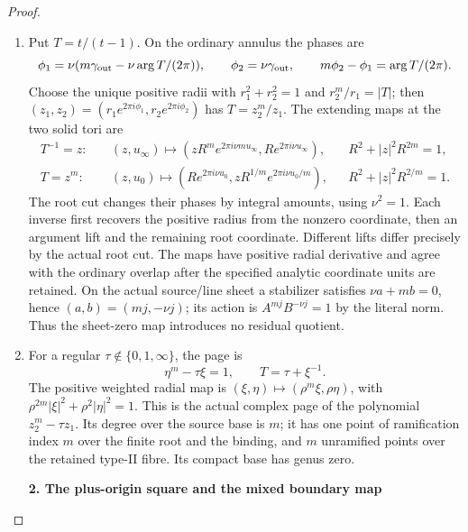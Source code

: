 \begin{proof}
\begin{enumerate}[label=\arabic*.]
\item Put \(T=t/(t-1)\). On the ordinary annulus the phases are
\[
\phi_1=\nu(m\gamma_{\rm out}-\nu\arg T/(2\pi)),\qquad
\phi_2=\nu\gamma_{\rm out},\qquad
m\phi_2-\phi_1=\arg T/(2\pi).
\]
Choose the unique positive radii with
\(r_1^2+r_2^2=1\) and \(r_2^m/r_1=|T|\); then
\((z_1,z_2)=(r_1e^{2\pi i\phi_1},r_2e^{2\pi i\phi_2})\)
has \(T=z_2^m/z_1\). The extending maps at the two solid tori are
\[
\begin{aligned}
T^{-1}=z:\quad &(z,u_\infty)\longmapsto
(zR^m e^{2\pi i\nu m u_\infty},R e^{2\pi i\nu u_\infty}),
&&R^2+|z|^2R^{2m}=1,\\
T=z^m:\quad &(z,u_0)\longmapsto
(R e^{2\pi i\nu u_0},zR^{1/m}e^{2\pi i\nu u_0/m}),
&&R^2+|z|^2R^{2/m}=1.
\end{aligned}
\]
The root cut changes their phases by integral amounts, using
\(\nu^2=1\). Each inverse first recovers the positive radius from
the nonzero coordinate, then an argument lift and the remaining
root coordinate. Different lifts differ precisely by the actual
root cut. The maps have positive radial derivative and agree with
the ordinary overlap after the specified analytic coordinate units
are retained. On the actual source/line sheet a stabilizer satisfies
\(\nu a+mb=0\), hence \((a,b)=(mj,-\nu j)\); its action is
\(A^{mj}B^{-\nu j}=1\) by the literal norm. Thus the sheet-zero
map introduces no residual quotient.

\item For a regular \(\tau\notin\{0,1,\infty\}\), the page is
\[
\eta^m-\tau\xi=1,\qquad T=\tau+\xi^{-1}.
\]
The positive weighted radial map is
\((\xi,\eta)\mapsto(\rho^m\xi,\rho\eta)\), with
\(\rho^{2m}|\xi|^2+\rho^2|\eta|^2=1\). This is the actual complex
page of the polynomial \(z_2^m-\tau z_1\). Its degree over the
source base is \(m\); it has one point of ramification index \(m\)
over the finite root and the binding, and \(m\) unramified points
over the retained type-II fibre. Its compact base has genus zero.

\par

\medskip\noindent\textbf{2. The plus-origin square and the mixed boundary map}

\par\nobreak


\end{enumerate}
\end{proof}

